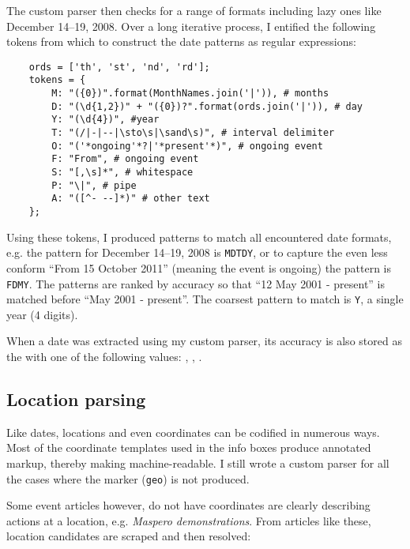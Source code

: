 The custom parser then checks for a range of formats including lazy ones like December 14--19, 2008.
Over a long iterative process, I entified the following tokens from which to construct the date patterns as regular expressions:

\begin{lstlisting}
	ords = ['th', 'st', 'nd', 'rd'];
	tokens = {
		M: "({0})".format(MonthNames.join('|')), # months
		D: "(\d{1,2})" + "({0})?".format(ords.join('|')), # day
		Y: "(\d{4})", #year
		T: "(/|-|--|\sto\s|\sand\s)", # interval delimiter
		O: "('*ongoing'*?|'*present'*)", # ongoing event
		F: "From", # ongoing event
		S: "[,\s]*", # whitespace
		P: "\|", # pipe
		A: "([^- --]*)" # other text
	};
\end{lstlisting}

Using these tokens, I produced patterns to match all encountered date formats, e.g. the pattern for December 14--19, 2008 is \verb"MDTDY", or to capture the even less conform ``From 15 October 2011'' (meaning the event is ongoing) the pattern is \verb"FDMY".
The patterns are ranked by accuracy so that ``12 May 2001 - present'' is matched before ``May 2001 - present''.
The coarsest pattern to match is \verb"Y", a single year (4 digits).

When a date was extracted using my custom parser, its accuracy is also stored as the  with one of the following values: , , .

\subsection{Location parsing}

Like dates, locations and even coordinates can be codified in numerous ways. 
Most of the coordinate templates used in the info boxes produce annotated markup, thereby making machine-readable.
I still wrote a custom parser for all the cases where the marker (\verb"geo") is not produced.

Some event articles however, do not have coordinates are clearly describing actions at a location, e.g. \emph{Maspero demonstrations}.
From articles like these, location candidates are scraped and then resolved:

